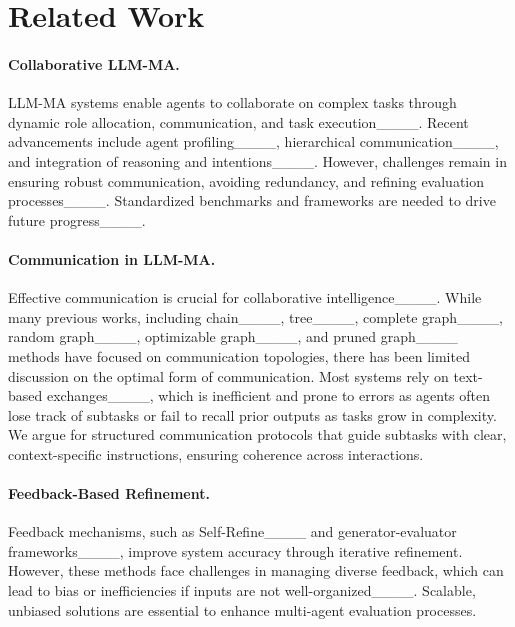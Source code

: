 \section{Related Work}
\label{rw}

\paragraph{Collaborative LLM-MA.}
LLM-MA systems enable agents to collaborate on complex tasks through dynamic role allocation, communication, and task execution____. Recent advancements include agent profiling____, hierarchical communication____, and integration of reasoning and intentions____. %
However, challenges remain in ensuring robust communication, avoiding redundancy, and refining evaluation processes____. Standardized benchmarks and frameworks are needed to drive future progress____.

\paragraph{Communication in LLM-MA.}
Effective communication is crucial for collaborative intelligence____. While many previous works, including chain____, tree____, complete graph____, random graph____, optimizable graph____, and pruned graph____ methods have focused on communication topologies, there has been limited discussion on the optimal form of communication. Most systems rely on text-based exchanges____, which is inefficient and prone to errors as agents often lose track of subtasks or fail to recall prior outputs as tasks grow in complexity. We argue for structured communication protocols that guide subtasks with clear, context-specific instructions, ensuring coherence across interactions.

\paragraph{Feedback-Based Refinement.}
Feedback mechanisms, such as Self-Refine____ and generator-evaluator frameworks____, improve system accuracy through iterative refinement. However, these methods face challenges in managing diverse feedback, which can lead to bias or inefficiencies if inputs are not well-organized____. Scalable, unbiased solutions are essential to enhance multi-agent evaluation processes.